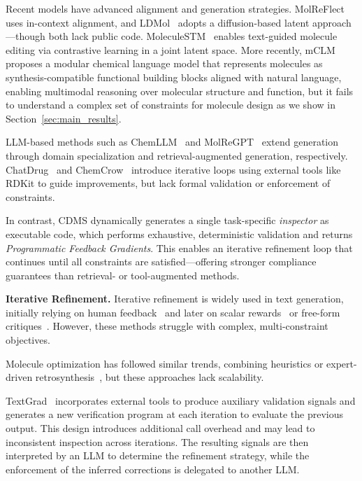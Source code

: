 \documentclass[10pt]{article} %
\begin{document}
Recent models have advanced alignment and generation strategies. MolReFlect~\cite{li2024molreflectincontextfinegrainedalignments} uses in-context alignment, and LDMol~\cite{chang2024ldmoltexttomoleculediffusionmodel} adopts a diffusion-based latent approach—though both lack public code. MoleculeSTM~\cite{liu2023moleculestm} enables text-guided molecule editing via contrastive learning in a joint latent space. More recently, mCLM~\cite{edwards2025mclmmodularchemicallanguage} proposes a modular chemical language model that represents molecules as synthesis-compatible functional building blocks aligned with natural language, enabling multimodal reasoning over molecular structure and function, but it fails to understand a complex set of constraints for molecule design as we show in Section~\ref{sec:main_results}.

LLM-based methods such as ChemLLM~\cite{zhang2024chemllm} and MolReGPT~\cite{molregpt} extend generation through domain specialization and retrieval-augmented generation, respectively. ChatDrug~\cite{liu2024chatdrug} and ChemCrow~\cite{bran2024chemcrow} introduce iterative loops using external tools like RDKit to guide improvements, but lack formal validation or enforcement of constraints.

In contrast, CDMS dynamically generates a single task-specific \emph{inspector} as executable code, which performs exhaustive, deterministic validation and returns \emph{Programmatic Feedback Gradients}. This enables an iterative refinement loop that continues until all constraints are satisfied—offering stronger compliance guarantees than retrieval- or tool-augmented methods.

\textbf{Iterative Refinement.}  
Iterative refinement is widely used in text generation, initially relying on human feedback~\cite{bai2022constitutional, fang2023single-step} and later on scalar rewards~\cite{Liu2022RainierRK} or free-form critiques~\cite{madaan2024self, shinn2023reflexion}. However, these methods struggle with complex, multi-constraint objectives.

Molecule optimization has followed similar trends, combining heuristics or expert-driven retrosynthesis~\cite{fang2023single-step, 10.1093/bioinformatics/btad157}, but these approaches lack scalability.

TextGrad~\cite{yuksekgonul2025optimizing} incorporates external tools to produce auxiliary validation signals and generates a new verification program at each iteration to evaluate the previous output. This design introduces additional call overhead and may lead to inconsistent inspection across iterations. The resulting signals are then interpreted by an LLM to determine the refinement strategy, while the enforcement of the inferred corrections is delegated to another LLM. 
\end{document}
